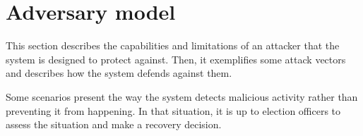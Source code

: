 \section{Adversary model} \label{sec: adversary model}
This section describes the capabilities and limitations of an attacker that the system is designed to protect against. Then, it exemplifies some attack vectors and describes how the system defends against them.

Some scenarios present the way the system detects malicious activity rather than preventing it from happening. In that situation, it is up to election officers to assess the situation and make a recovery decision.
